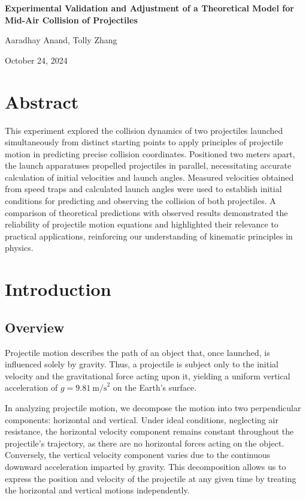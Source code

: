 \documentclass[12pt]{article}
\begin{document}
\begin{titlepage}
    \centering
    \vfill
    \vspace*{2.5in}
    {\Huge\bfseries Experimental Validation and Adjustment of a Theoretical Model for Mid-Air Collision of Projectiles \par}
    \vspace{0.2in}
    {\LARGE Aaradhay Anand, Tolly Zhang\par}
    \vspace{0.2in}
    {\LARGE October 24, 2024 \par}
    \vfill
\end{titlepage}

\newpage

\section{Abstract}
This experiment explored the collision dynamics of two projectiles launched simultaneously from distinct starting points to apply principles of projectile motion in predicting precise collision coordinates. Positioned two meters apart, the launch apparatuses propelled projectiles in parallel, necessitating accurate calculation of initial velocities and launch angles. Measured velocities obtained from speed traps and calculated launch angles were used to establish initial conditions for predicting and observing the collision of both projectiles. A comparison of theoretical predictions with observed results demonstrated the reliability of projectile motion equations and highlighted their relevance to practical applications, reinforcing our understanding of kinematic principles in physics.

\section{Introduction}

\subsection{Overview}

Projectile motion describes the path of an object that, once launched, is influenced solely by gravity. Thus, a projectile is subject only to the initial velocity and the gravitational force acting upon it, yielding a uniform vertical acceleration of \( g = 9.81 \ \text{m/s}^2 \) on the Earth's surface.

In analyzing projectile motion, we decompose the motion into two perpendicular components: horizontal and vertical. Under ideal conditions, neglecting air resistance, the horizontal velocity component remains constant throughout the projectile's trajectory, as there are no horizontal forces acting on the object. Conversely, the vertical velocity component varies due to the continuous downward acceleration imparted by gravity. This decomposition allows us to express the position and velocity of the projectile at any given time by treating the horizontal and vertical motions independently.
\end{document}
